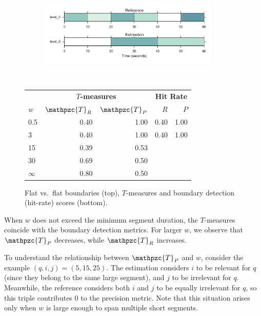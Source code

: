 \documentclass{article}
\def\shag{\ensuremath{\mathpzc{T}}}
\begin{document}
\begin{figure}
  \centering
  \begin{subfigure}{0.5\textwidth}
    \centering
    \includegraphics[width=0.94\textwidth]{figs/flat-flat.pdf}
  \end{subfigure}%
  \\
  \begin{minipage}{0.5\textwidth}
    \small
    \centering
    \vspace{10pt}
    \begin{tabular}{l|rr|rr}
      & \multicolumn{2}{c|}{\textbf{$T$-measures}} & \multicolumn{2}{c}{\textbf{Hit Rate}} \\
      $w$ & $\shag_R$   & $\shag_P$ &  $R$     & $P$ \\
      \hline
      0.5       & 0.40   & 1.00   & 0.40 & 1.00 \\
      3         & 0.40   & 1.00   & 0.40 & 1.00 \\
      15        & 0.39  & 0.53 \\
      30        & 0.69  & 0.50 \\
      $\infty$  & 0.80   & 0.50 
    \end{tabular}
  \end{minipage}
  \caption{Flat vs.\ flat boundaries (top), $T$-measures and boundary detection
    (hit-rate) scores (bottom).}
  \label{fig:flat-flat}
\end{figure}

When $w$ does not exceed the minimum segment duration, the $T$-measures coincide
with the boundary detection metrics.
For larger $w$, we observe that $\shag_P$ decreases, while $\shag_R$ increases.

To understand the relationship between $\shag_P$ and $w$, consider the example 
$(q,i,j) = (5,15,25)$.
The estimation considers $i$ to be relevant for $q$ (since they belong to the same large
segment), and $j$ to be irrelevant for $q$. Meanwhile, the reference considers both $i$
and $j$ to be equally irrelevant for $q$, so this triple contributes 0 to the precision
metric.
Note that this situation arises only when $w$ is large enough to span multiple short
segments.
\end{document}
